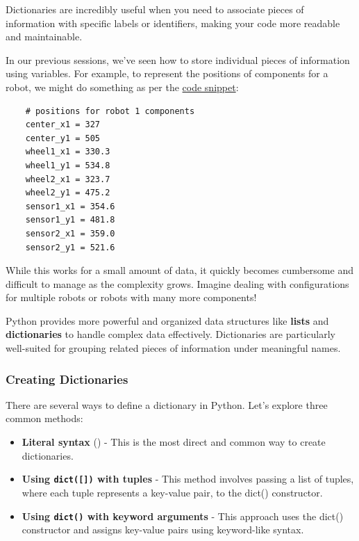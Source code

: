 Dictionaries are incredibly useful when you need to associate pieces of information with specific labels or identifiers, making your code more readable and maintainable.


In our previous sessions, we've seen how to store individual pieces of information using variables. For example, to represent the positions of components for a robot, we might do something as per the  \href{https://github.com/balandongiv/computer_programming_gist/blob/main/session3/session3_robot_template.py}{code snippet}:

\begin{verbatim}
    # positions for robot 1 components
    center_x1 = 327
    center_y1 = 505
    wheel1_x1 = 330.3
    wheel1_y1 = 534.8
    wheel2_x1 = 323.7
    wheel2_y1 = 475.2
    sensor1_x1 = 354.6
    sensor1_y1 = 481.8
    sensor2_x1 = 359.0
    sensor2_y1 = 521.6
\end{verbatim}

While this works for a small amount of data, it quickly becomes cumbersome and difficult to manage as the complexity grows. Imagine dealing with configurations for multiple robots or robots with many more components!


Python provides more powerful and organized data structures like \textbf{lists} and \textbf{dictionaries} to handle complex data effectively. Dictionaries are particularly well-suited for grouping related pieces of information under meaningful names.

\subsubsection{Creating Dictionaries}
\label{subsubsec:creating_dicts}
There are several ways to define a dictionary in Python. Let's explore three common methods:

\begin{itemize}
\item \textbf{Literal syntax} ({}) - This is the most direct and common way to create dictionaries.
\item \textbf{Using \texttt{dict([])} with tuples} - This method involves passing a list of tuples, where each tuple represents a key-value pair, to the dict() constructor.
\item \textbf{Using \texttt{dict()} with keyword arguments} - This approach uses the dict() constructor and assigns key-value pairs using keyword-like syntax.
\end{itemize}

